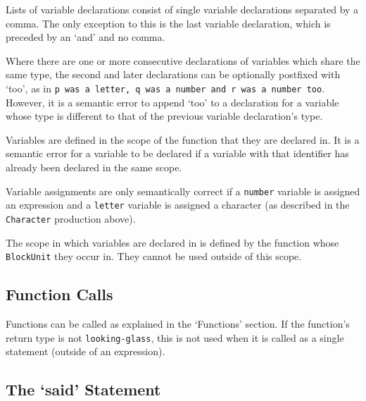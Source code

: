 \documentclass[a4wide, 11pt]{article}
\begin{document}
Lists of variable declarations consist of single variable declarations separated by a comma. The only exception to this is the last variable declaration, which is preceded by an `and' and no comma.

Where there are one or more consecutive declarations of variables which share the same type, the second and later declarations can be optionally postfixed with `too', as in \texttt{p was a letter, q was a number and r was a number too}. However, it is a semantic error to append `too' to a declaration for a variable whose type is different to that of the previous variable declaration's type.

Variables are defined in the scope of the function that they are declared in. It is a semantic error for a variable to be declared if a variable with that identifier has already been declared in the same scope.

Variable assignments are only semantically correct if a \texttt{number} variable is assigned an expression and a \texttt{letter} variable is assigned a character (as described in the \texttt{Character} production above).

The scope in which variables are declared in is defined by the function whose \texttt{BlockUnit} they occur in. They cannot be used outside of this scope.

\subsection{Function Calls}

Functions can be called as explained in the `Functions' section. If the function's return type is not \texttt{looking-glass}, this is not used when it is called as a single statement (outside of an expression).

\subsection{The `said' Statement}
\end{document}
